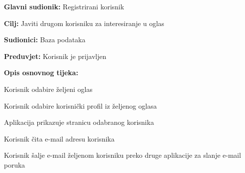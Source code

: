 				\noindent {}
					\begin{packed_item}
	
						\item \textbf{Glavni sudionik: }Registrirani korisnik
						\item  \textbf{Cilj:} Javiti drugom korisniku za interesiranje u oglas
						\item  \textbf{Sudionici:} Baza podataka
						\item  \textbf{Preduvjet:} Korisnik je prijavljen
						\item  \textbf{Opis osnovnog tijeka:}
						
						\item[] \begin{packed_enum}
	
							\item Korisnik odabire željeni oglas
							\item Korisnik odabire korisnički profil iz željenog oglasa
							\item Aplikacija prikazuje stranicu odabranog korisnika
							\item Korisnik čita e-mail adresu korisnika
							\item Korisnik šalje e-mail željenom korisniku preko druge aplikacije za slanje e-mail poruka

						\end{packed_enum}						
					\end{packed_item}
					
